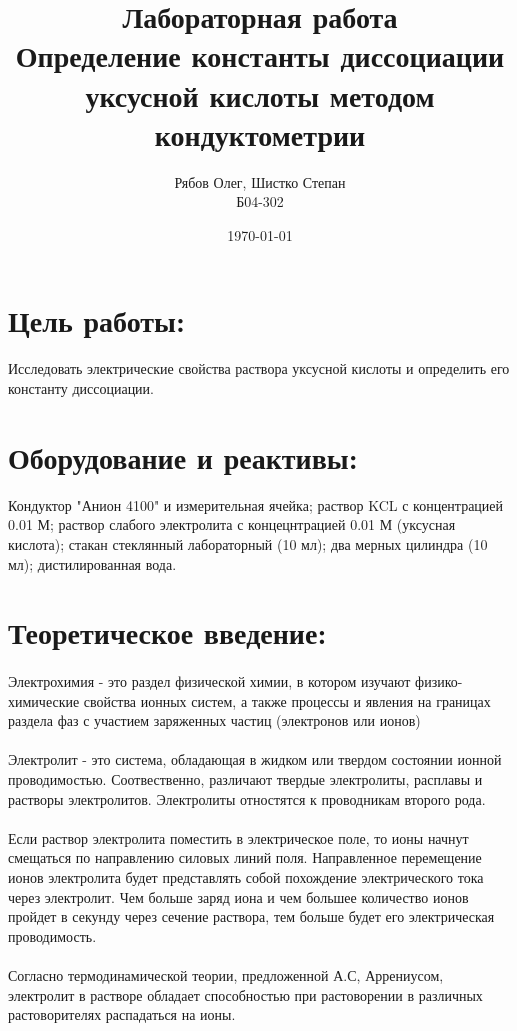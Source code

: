 \documentclass[a4paper,12pt]{article} %
\title{\textbf{Лабораторная работа \\ Определение константы диссоциации уксусной кислоты методом кондуктометрии} }
\author{Рябов Олег, Шистко Степан \\ Б04-302}
\date{\today}
\begin{document}
\maketitle

\section{Цель работы:}
Исследовать электрические свойства раствора уксусной кислоты и определить его константу диссоциации.
\section{Оборудование и реактивы:}
Кондуктор "Анион 4100" и измерительная ячейка; раствор KCL с концентрацией 0.01 М; раствор слабого электролита с концецнтрацией 0.01 М (уксусная кислота); стакан стеклянный лабораторный (10 мл); два мерных цилиндра (10 мл); дистилированная вода.
\section{Теоретическое введение:}
\paragraph{}
Электрохимия - это раздел физической химии, в котором изучают физико-химические свойства ионных систем, а также процессы и явления на границах раздела фаз с участием заряженных частиц (электронов или ионов)
\paragraph{}
Электролит - это система, обладающая в жидком или твердом состоянии ионной проводимостью. Соотвественно, различают твердые электролиты, расплавы и растворы электролитов. Электролиты отностятся к проводникам второго рода.
\paragraph{}
Если раствор электролита поместить в электрическое поле, то ионы начнут смещаться по направлению силовых линий поля. Направленное перемещение ионов электролита будет представлять собой похождение электрического тока через электролит. Чем больше заряд иона и чем большее количество ионов пройдет в секунду через сечение раствора, тем больше будет его электрическая проводимость.
\paragraph{}
Согласно термодинамической теории, предложенной А.С, Аррениусом, электролит в растворе обладает способностью при растоворении в различных растоворителях распадаться на ионы.
\end{document}
